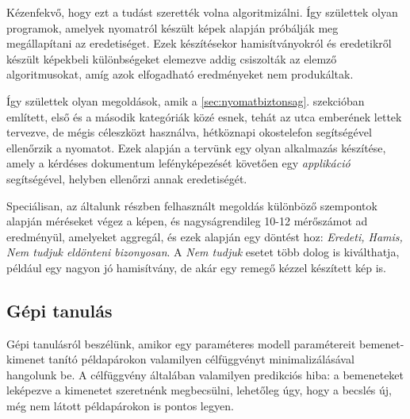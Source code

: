 
Kézenfekvő, hogy ezt a tudást szerették volna algoritmizálni. Így születtek olyan
programok, amelyek nyomatról készült képek alapján próbálják meg megállapítani
az eredetiséget. Ezek készítésekor hamisítványokról és eredetikről készült
képekbeli különbségeket elemezve addig csiszolták az elemző algoritmusokat,
amíg azok elfogadható eredményeket nem produkáltak.

%


Így születtek olyan megoldások, amik a \ref{sec:nyomatbiztonsag}. 
szekcióban említett, első és a második kategóriák közé esnek, tehát az utca emberének lettek tervezve, 
de mégis céleszközt használva, hétköznapi okostelefon segítségével ellenőrzik a nyomatot.
Ezek alapján a tervünk egy olyan alkalmazás készítése, amely a kérdéses dokumentum
lefényképezését követően egy \textit{applikáció} segítségével, helyben ellenőrzi annak eredetiségét.


Speciálisan, az általunk részben felhasznált megoldás különböző szempontok alapján méréseket
végez a képen, és nagyságrendileg 10-12 mérőszámot ad eredményül, amelyeket
aggregál, és ezek alapján egy döntést hoz: \textit{Eredeti, Hamis, Nem tudjuk eldönteni bizonyosan}. A \textit{Nem tudjuk} esetet több dolog is kiválthatja, például egy nagyon jó hamisítvány, de akár egy remegő kézzel készített kép is.

\subsection{Gépi tanulás}

Gépi tanulásról beszélünk, amikor egy paraméteres modell paramétereit bemenet-kimenet tanító példapárokon valamilyen célfüggvényt minimalizálásával hangolunk be. A célfüggvény általában valamilyen predikciós hiba: a bemeneteket leképezve a kimenetet szeretnénk megbecsülni, lehetőleg úgy, hogy a becslés új, még nem látott példapárokon is pontos legyen.

